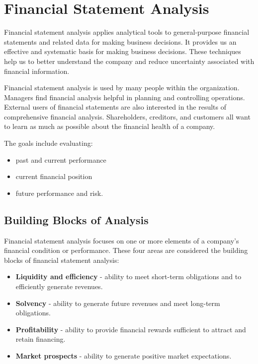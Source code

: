 \documentclass[../main.tex]{subfiles}
\begin{document}
	\section{Financial Statement Analysis}
	
	Financial statement analysis applies analytical tools to general-purpose 
	financial statements and related data for making business decisions.  It 
	provides us an effective and systematic basis for making business 
	decisions. These techniques help us to better understand the company and 
	reduce uncertainty associated with financial information.
	
	
	Financial statement analysis is used by many people within the 
	organization. Managers find financial analysis helpful in planning and 
	controlling operations. External users of financial statements are also 
	interested in the results of comprehensive financial analysis. 
	Shareholders, creditors, and customers all want to learn as much as 
	possible about the financial health of a company.
	
	The goals include evaluating:
	\begin{itemize}[noitemsep]
		\item past and current performance 
		\item current financial position
		\item future performance and risk.
	\end{itemize}
	
	\subsection{Building Blocks of Analysis}
	
	Financial statement analysis focuses on one or more elements of a company’s 
	financial condition or performance. These four areas are considered the 
	building blocks of financial statement analysis:
	\begin{itemize}[noitemsep]
		\item \textbf{Liquidity and efficiency} - ability to meet short-term 
		obligations 
		and to efficiently generate revenues.
		\item \textbf{Solvency} - ability to generate future revenues and meet 
		long-term 
		obligations.
		\item \textbf{Profitability} - ability to provide financial rewards 
		sufficient to 
		attract and retain financing.
		\item \textbf{Market prospects} - ability to generate positive market 
		expectations.
	\end{itemize}
	
\end{document}

